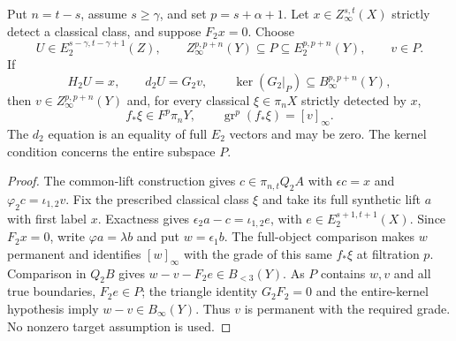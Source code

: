 \begin{corollary}
\label{sem:ProofTools:coverage-two-layer-permanent}
Put $n=t-s$, assume $s\ge\gamma$, and set $p=s+\alpha+1$.
Let $x\in Z_\infty^{s,t}(X)$ strictly detect a classical class, and
suppose $F_2x=0$. Choose
\[
 U\in E_2^{s-\gamma,t-\gamma+1}(Z),\qquad
 Z_\infty^{p,p+n}(Y)\subseteq P\subseteq E_2^{p,p+n}(Y),
 \qquad v\in P.
\]
If
\[
 H_2U=x,\qquad d_2U=G_2v,\qquad
 \ker(G_2|_P)\subseteq B_\infty^{p,p+n}(Y),
\]
then $v\in Z_\infty^{p,p+n}(Y)$ and, for every classical
$\xi\in\pi_nX$ strictly detected by $x$,
\[
 f_*\xi\in F^p\pi_nY,\qquad
 \operatorname{gr}^{p}(f_*\xi)=[v]_\infty.
\]
The $d_2$ equation is an equality of full $E_2$ vectors and may be zero.
The kernel condition concerns the entire subspace $P$.
\end{corollary}
\begin{proof}
The common-lift construction gives $c\in\pi_{n,t}Q_2A$ with
$\epsilon c=x$ and $\varphi_2c=\iota_{1,2}v$.
Fix the prescribed classical class $\xi$ and take its full synthetic
lift $a$ with first label $x$. Exactness gives
$\epsilon_2a-c=\iota_{1,2}e$, with
$e\in E_2^{s+1,t+1}(X)$.
Since $F_2x=0$, write $\varphi a=\lambda b$ and put $w=\epsilon_1b$.
The full-object comparison makes $w$ permanent and identifies
$[w]_\infty$ with the grade of this same $f_*\xi$ at filtration $p$.
Comparison in $Q_2B$ gives
$w-v-F_2e\in B_{<3}(Y)$. As $P$ contains $w,v$ and all true
boundaries, $F_2e\in P$; the triangle identity $G_2F_2=0$ and the
entire-kernel hypothesis imply $w-v\in B_\infty(Y)$.
Thus $v$ is permanent with the required grade. No nonzero target
assumption is used.
\end{proof}

